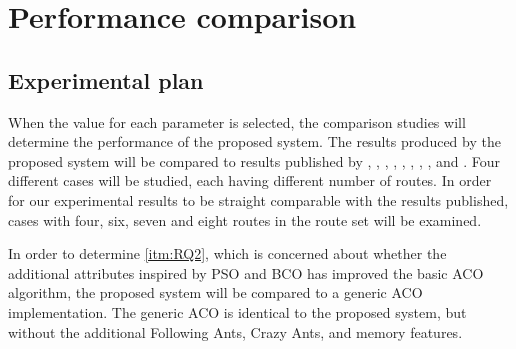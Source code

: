 \section{Performance comparison}
\label{sec:performanceComparison}
\subsection{Experimental plan}
When the value for each parameter is selected, the comparison studies will determine the performance of the proposed system. The results produced by the proposed system will be compared to results published by \citet{mandl79}, \citet{kechagiopoulos14}, \citet{nikolic14}, \citet{kidwai98}, \citet{fan10}, \citet{chakroborty02}, \citet{zhang10}, \citet{chew12}, and \citet{baaj91}. Four different cases will be studied, each having different number of routes. In order for our experimental results to be straight comparable with the results published, cases with four, six, seven and eight routes in the route set will be examined.

In order to determine \vref{itm:RQ2}, which is concerned about whether the additional attributes inspired by PSO and BCO has improved the basic ACO algorithm, the proposed system will be compared to a generic ACO implementation. The generic ACO is identical to the proposed system, but without the additional Following Ants, Crazy Ants, and memory features. 

